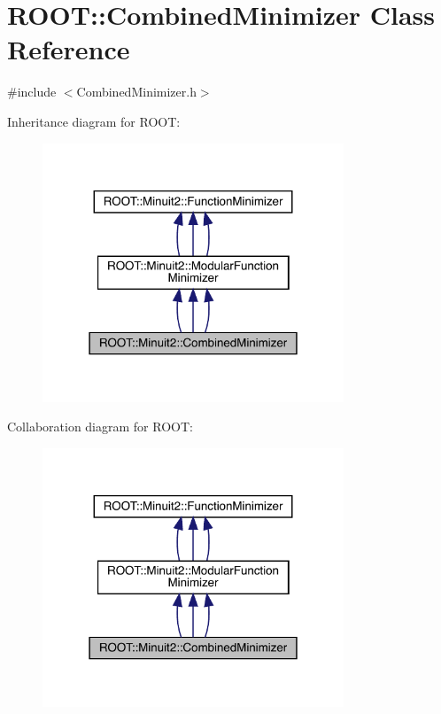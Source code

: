 \hypertarget{classROOT_1_1Minuit2_1_1CombinedMinimizer}{}\section{R\+O\+OT\+:\+:Combined\+Minimizer Class Reference}
\label{classROOT_1_1Minuit2_1_1CombinedMinimizer}


{\ttfamily \#include $<$Combined\+Minimizer.\+h$>$}



Inheritance diagram for R\+O\+OT\+:
\nopagebreak
\begin{figure}[H]
\begin{center}
\leavevmode
\includegraphics[width=255pt]{d1/d12/classROOT_1_1Minuit2_1_1CombinedMinimizer__inherit__graph}
\end{center}
\end{figure}


Collaboration diagram for R\+O\+OT\+:
\nopagebreak
\begin{figure}[H]
\begin{center}
\leavevmode
\includegraphics[width=255pt]{de/d4a/classROOT_1_1Minuit2_1_1CombinedMinimizer__coll__graph}
\end{center}
\end{figure}

